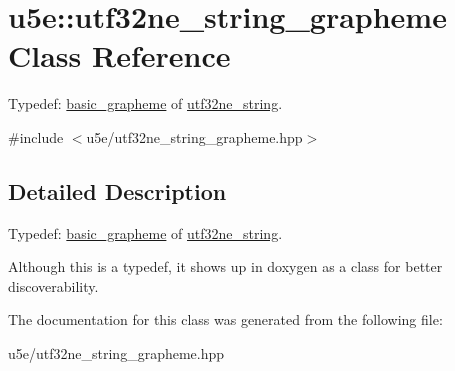 \hypertarget{classu5e_1_1utf32ne__string__grapheme}{}\section{u5e\+:\+:utf32ne\+\_\+string\+\_\+grapheme Class Reference}
\label{classu5e_1_1utf32ne__string__grapheme}


Typedef\+: \hyperlink{classu5e_1_1basic__grapheme}{basic\+\_\+grapheme} of \hyperlink{classu5e_1_1utf32ne__string}{utf32ne\+\_\+string}.  




{\ttfamily \#include $<$u5e/utf32ne\+\_\+string\+\_\+grapheme.\+hpp$>$}



\subsection{Detailed Description}
Typedef\+: \hyperlink{classu5e_1_1basic__grapheme}{basic\+\_\+grapheme} of \hyperlink{classu5e_1_1utf32ne__string}{utf32ne\+\_\+string}. 

Although this is a typedef, it shows up in doxygen as a class for better discoverability. 

The documentation for this class was generated from the following file\+:\begin{DoxyCompactItemize}
\item 
u5e/utf32ne\+\_\+string\+\_\+grapheme.\+hpp\end{DoxyCompactItemize}
